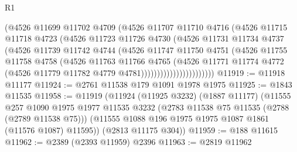 \begin{lexlean}{R1}
\begin{coremodule}
                            (@4526
                              @11699
                              @11702
                              @4709
                              (@4526
                                @11707
                                @11710
                                @4716
                                (@4526
                                  @11715
                                  @11718
                                  @4723
                                  (@4526
                                    @11723
                                    @11726
                                    @4730
                                    (@4526
                                      @11731
                                      @11734
                                      @4737
                                      (@4526
                                        @11739
                                        @11742
                                        @4744
                                        (@4526
                                          @11747
                                          @11750
                                          @4751
                                          (@4526
                                            @11755
                                            @11758
                                            @4758
                                            (@4526
                                              @11763
                                              @11766
                                              @4765
                                              (@4526
                                                @11771
                                                @11774
                                                @4772
                                                (@4526
                                                  @11779
                                                  @11782
                                                  @4779
                                                  @4781)))))))))))))))))))))))
@11919 := @11918 @11177
@11924 := @2761 @11538 @179 @1091 @1978 @1975
@11925 := @1843 @11535
@11958 := @11919
    (@11924
      (@11925 @3232)
      (@1887 @11177)
      (@11555
        @257
        @1090
        @1975
        @1977
        @11535
        @3232
        (@2783 @11538 @75 @11535 (@2788 (@2789 @11538 @75)))
        (@11555 @1088 @196 @1975 @1975 @1087 @1861 (@11576 @1087) @11595))
      (@2813 @11175 @304))
@11959 := @188 @11615
@11962 := @2389 (@2393 @11959) @2396
@11963 := @2819 @11962

\end{coremodule}
\end{lexlean}
